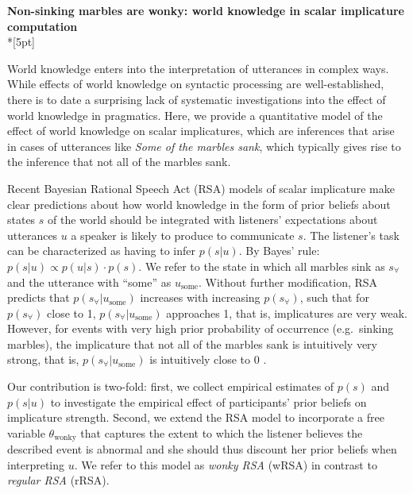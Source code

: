 \documentclass[11pt]{article}
\begin{document}
\begin{center}\textbf{Non-sinking marbles are wonky: world knowledge in  scalar implicature computation}\\*[5pt]
\end{center}

\vspace{-11pt}

World knowledge enters into the interpretation of utterances in complex ways. While effects of world knowledge on syntactic processing are well-established, there is to date a surprising lack of systematic investigations into the effect of world knowledge in pragmatics. Here, we provide a quantitative model of the effect of world knowledge  on  scalar implicatures, which are inferences that arise in cases of utterances like \textit{Some of the marbles sank}, which typically gives rise to the inference that not all of the marbles sank.

Recent Bayesian Rational Speech Act (RSA)  models of scalar implicature \cite{frank2012} make clear predictions about how world knowledge in the form of prior beliefs about states $s$ of the world should be integrated with listeners' expectations about utterances $u$ a speaker is likely to produce to communicate $s$. The listener's task can be characterized as having to infer $p(s|u)$. By Bayes' rule: $p(s|u)\propto p(u|s)\cdot p(s)$. We refer to the state in which all marbles sink as $s_{\forall}$ and the utterance with ``some'' as $u_{\textrm{some}}$. Without further modification, RSA predicts that $p(s_{\forall}|u_{\textrm{some}})$ increases with increasing $p(s_{\forall})$, such that for $p(s_{\forall})$ close to 1, $p(s_{\forall}|u_{\textrm{some}})$ approaches 1, that is, implicatures are very weak. However, for events with very high prior probability of occurrence (e.g.~sinking marbles), the implicature that not all of the marbles sank is intuitively very strong, that is, $p(s_{\forall}|u_{\textrm{some}})$ is intuitively close to 0 \cite{geurts2010}. 

Our contribution is two-fold: first, we collect empirical estimates of $p(s)$ and $p(s|u)$ to investigate the empirical effect of participants' prior beliefs on implicature strength. Second, we extend the RSA model to incorporate a free variable $\theta_{\textrm{wonky}}$ that captures the extent to which the listener believes the described event is abnormal and she should thus discount her prior beliefs when interpreting $u$. We refer to this model as \textit{wonky RSA} (wRSA) in contrast to \textit{regular RSA} (rRSA). 
\end{document}
